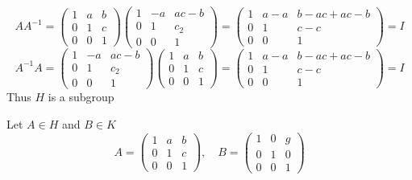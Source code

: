 \documentclass[12pt, letterpaper]{article}
\theoremstyle{definition}
\begin{document}
\begin{itemize}
    \[
    AA^{-1} = \begin{pmatrix}
    1 & a & b \\
    0 & 1 & c \\
    0 & 0 & 1
    \end{pmatrix} 
    \begin{pmatrix}
    1 & -a & ac-b \\
    0 & 1 & c_2 \\
    0 & 0 & 1
    \end{pmatrix}
    = \begin{pmatrix}
    1 & a-a & b - ac + ac - b \\
    0 & 1 & c - c \\
    0 & 0 & 1
    \end{pmatrix} = I
    \]
    \[
    A^{-1}A = \begin{pmatrix}
    1 & -a & ac-b \\
    0 & 1 & c_2 \\
    0 & 0 & 1
    \end{pmatrix}
    \begin{pmatrix}
    1 & a & b \\
    0 & 1 & c \\
    0 & 0 & 1
    \end{pmatrix}
    = \begin{pmatrix}
    1 & a-a & b - ac + ac - b \\
    0 & 1 & c - c \\
    0 & 0 & 1
    \end{pmatrix} = I
    \]
    Thus $H$ is a subgroup
\end{itemize}

Let $A \in H$ and $B \in K$
\[
    A = \begin{pmatrix}
    1 & a & b \\
    0 & 1 & c \\
    0 & 0 & 1
    \end{pmatrix}, \quad B = \begin{pmatrix}
    1 & 0 & g \\
    0 & 1 & 0 \\
    0 & 0 & 1
    \end{pmatrix}
    \]
\end{document}

